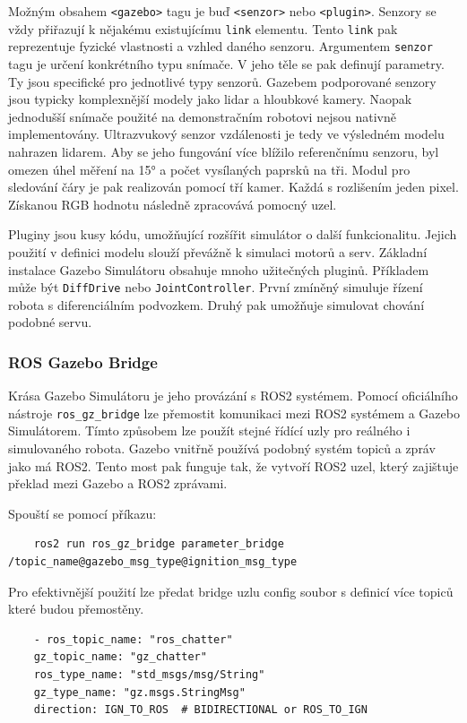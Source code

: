 Možným obsahem \verb|<gazebo>| tagu je buď \verb|<senzor>| nebo \verb|<plugin>|. Senzory se vždy přiřazují k nějakému existujícímu \verb|link| elementu. Tento \verb|link| pak reprezentuje fyzické vlastnosti a vzhled daného senzoru. Argumentem \verb|senzor| tagu je určení konkrétního typu snímače. V jeho těle se pak definují parametry. Ty jsou specifické pro jednotlivé typy senzorů. Gazebem podporované senzory jsou typicky komplexnější modely jako lidar a hloubkové kamery. Naopak jednodušší snímače použité na demonstračním robotovi nejsou nativně implementovány. Ultrazvukový senzor vzdálenosti je tedy ve výsledném modelu nahrazen lidarem. Aby se jeho fungování více blížilo referenčnímu senzoru, byl omezen úhel měření na 15° a počet vysílaných paprsků na tři. Modul pro sledování čáry je pak realizován pomocí tří kamer. Každá s rozlišením jeden pixel. Získanou RGB hodnotu následně zpracovává pomocný uzel.

Pluginy jsou kusy kódu, umožňující rozšířit simulátor o další funkcionalitu. Jejich použití v definici modelu slouží převážně k simulaci motorů a serv. Základní instalace Gazebo Simulátoru obsahuje mnoho užitečných pluginů. Příkladem může být \verb|DiffDrive| nebo \verb|JointController|. První zmíněný simuluje řízení robota s diferenciálním podvozkem. Druhý pak umožňuje simulovat chování podobné servu. 

\subsubsection*{ROS Gazebo Bridge}
Krása Gazebo Simulátoru je jeho provázání s ROS2 systémem. Pomocí oficiálního nástroje \verb|ros_gz_bridge| lze přemostit komunikaci mezi ROS2 systémem a Gazebo Simulátorem. Tímto způsobem lze použít stejné řídící uzly pro reálného i simulovaného robota. Gazebo vnitřně používá podobný systém topiců a zpráv jako má ROS2. Tento most pak funguje tak, že vytvoří ROS2 uzel, který zajištuje překlad mezi Gazebo a ROS2 zprávami.

Spouští se pomocí příkazu:
\begin{verbatim}
	ros2 run ros_gz_bridge parameter_bridge /topic_name@gazebo_msg_type@ignition_msg_type
\end{verbatim}
Pro efektivnější použití lze předat bridge uzlu config soubor s definicí více topiců které budou přemostěny.
\begin{verbatim}
	- ros_topic_name: "ros_chatter"
	gz_topic_name: "gz_chatter"
	ros_type_name: "std_msgs/msg/String"
	gz_type_name: "gz.msgs.StringMsg"
	direction: IGN_TO_ROS  # BIDIRECTIONAL or ROS_TO_IGN
\end{verbatim}

